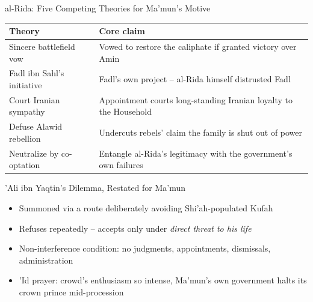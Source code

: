 \begin{frame}{al-Rida: Five Competing Theories for Ma'mun's Motive}
\centering\scriptsize
\renewcommand{\arraystretch}{1.5}
\begin{tabular}{|p{3.6cm}|p{6.8cm}|}
\hline
\textbf{Theory} & \textbf{Core claim} \\\hline
Sincere battlefield vow & Vowed to restore the caliphate if granted victory over Amin \\\hline
Fadl ibn Sahl's initiative & Fadl's own project -- al-Rida himself distrusted Fadl \\\hline
Court Iranian sympathy & Appointment courts long-standing Iranian loyalty to the Household \\\hline
Defuse Alawid rebellion & Undercuts rebels' claim the family is shut out of power \\\hline
Neutralize by co-optation & Entangle al-Rida's legitimacy with the government's own failures \\\hline
\end{tabular}
\vspace{0.3cm}
\end{frame}

\begin{frame}{'Ali ibn Yaqtin's Dilemma, Restated for Ma'mun}
\begin{itemize}[itemsep=5pt]
  \item Summoned via a route deliberately avoiding Shi'ah-populated Kufah
  \item Refuses repeatedly -- accepts only under \emph{direct threat to his life}
  \item Non-interference condition: no judgments, appointments, dismissals, administration
  \item 'Id prayer: crowd's enthusiasm so intense, Ma'mun's own government halts its crown prince mid-procession
\end{itemize}
\end{frame}

